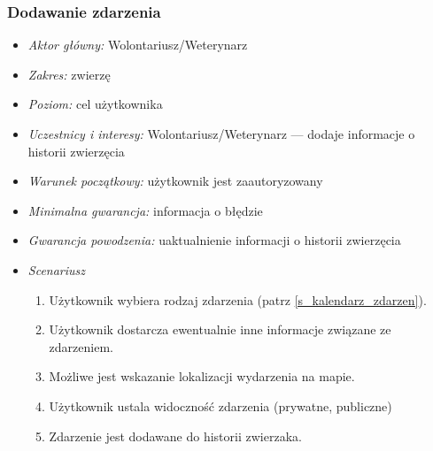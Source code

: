 \documentclass[10pt,a4paper]{article}
\begin{document}
\subsubsection{Dodawanie zdarzenia}
\begin{itemize}
	\item \emph{Aktor główny:} Wolontariusz/Weterynarz
	\item \emph{Zakres:} zwierzę
	\item \emph{Poziom:} cel użytkownika
	\item \emph{Uczestnicy i interesy:} 
		Wolontariusz/Weterynarz --- dodaje informacje o historii zwierzęcia
	\item \emph{Warunek początkowy:} użytkownik jest zaautoryzowany
	\item \emph{Minimalna gwarancja:} informacja o błędzie
	\item \emph{Gwarancja powodzenia:} uaktualnienie informacji o historii zwierzęcia
	\item \emph{Scenariusz}
	\begin{enumerate}
		\item Użytkownik wybiera rodzaj zdarzenia (patrz \ref{s_kalendarz_zdarzen}).
		\item Użytkownik dostarcza ewentualnie inne informacje związane ze zdarzeniem.
		\item Możliwe jest wskazanie lokalizacji wydarzenia na mapie.
		\item Użytkownik ustala widoczność zdarzenia (prywatne, publiczne)
		\item Zdarzenie jest dodawane do historii zwierzaka.
	\end{enumerate}
\end{itemize}
\end{document}
